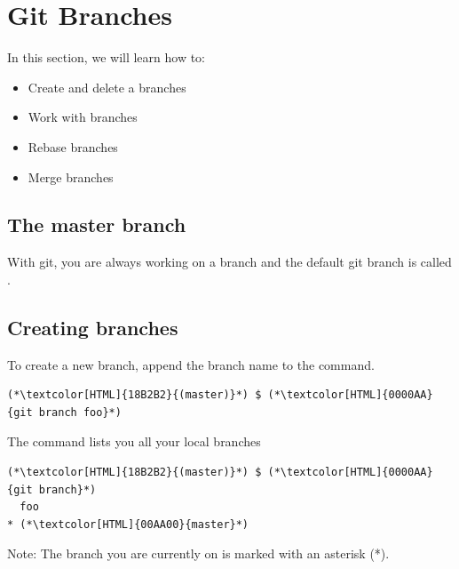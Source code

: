 \section{Git Branches}
\begin{frame}[fragile]
  \slidetitle

  In this section, we will learn how to:
  \begin{itemize}
    \item Create and delete a branches
    \item Work with branches
    \item Rebase branches
    \item Merge branches
  \end{itemize}
\end{frame}

\subsection{The master branch}
\begin{frame}[fragile]
  \subslidetitle

  With git, you are always working on a branch and the default git branch is called .

\end{frame}

\subsection{Creating branches}
\begin{frame}[fragile]
  \subslidetitle

  To create a new  branch, append the branch name to the  command.
  \begin{lstlisting}
(*\textcolor[HTML]{18B2B2}{(master)}*) $ (*\textcolor[HTML]{0000AA}{git branch foo}*)
\end{lstlisting}

  The  command lists you all your local branches
  \begin{lstlisting}
(*\textcolor[HTML]{18B2B2}{(master)}*) $ (*\textcolor[HTML]{0000AA}{git branch}*)
  foo
* (*\textcolor[HTML]{00AA00}{master}*)
\end{lstlisting}

Note: The branch you are currently on is marked with an asterisk (*).
\end{frame}

